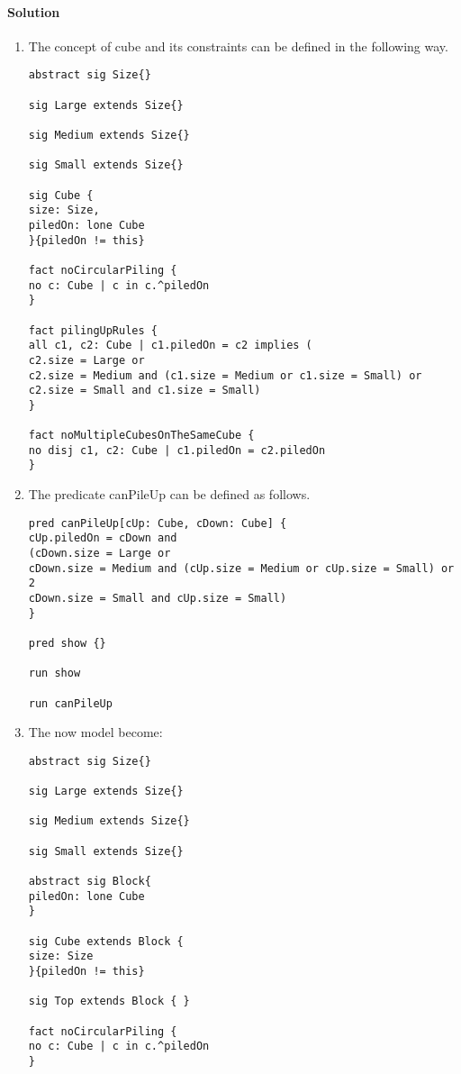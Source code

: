 \paragraph*{Solution}
\begin{enumerate}
\item The concept of cube and its constraints can be defined in the following way. 
    \begin{lstlisting}[language=alloy]
abstract sig Size{}

sig Large extends Size{} 

sig Medium extends Size{} 

sig Small extends Size{}

sig Cube {
size: Size,
piledOn: lone Cube
}{piledOn != this}

fact noCircularPiling {
no c: Cube | c in c.^piledOn
}

fact pilingUpRules {
all c1, c2: Cube | c1.piledOn = c2 implies (
c2.size = Large or
c2.size = Medium and (c1.size = Medium or c1.size = Small) or c2.size = Small and c1.size = Small)
}

fact noMultipleCubesOnTheSameCube {
no disj c1, c2: Cube | c1.piledOn = c2.piledOn
}
    \end{lstlisting}
\item The predicate canPileUp can be defined as follows. 
    \begin{lstlisting}[language=alloy]
pred canPileUp[cUp: Cube, cDown: Cube] {
cUp.piledOn = cDown and
(cDown.size = Large or
cDown.size = Medium and (cUp.size = Medium or cUp.size = Small) or 2
cDown.size = Small and cUp.size = Small) 
}

pred show {} 

run show

run canPileUp
    \end{lstlisting}
\item The now model become: 
    \begin{lstlisting}[language=alloy]
abstract sig Size{}

sig Large extends Size{} 

sig Medium extends Size{} 

sig Small extends Size{}

abstract sig Block{ 
piledOn: lone Cube
}

sig Cube extends Block { 
size: Size
}{piledOn != this}

sig Top extends Block { }

fact noCircularPiling {
no c: Cube | c in c.^piledOn
}


\end{lstlisting}
\end{enumerate}
